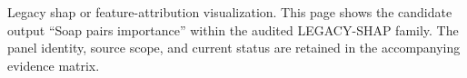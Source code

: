 Legacy shap or feature-attribution visualization. This page shows the candidate output ``Soap pairs importance'' within the audited LEGACY-SHAP family. The panel identity, source scope, and current status are retained in the accompanying evidence matrix.
